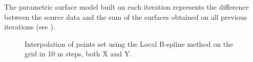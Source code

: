 The parametric surface model built on each iteration represents the difference between the source data and the sum of the surfaces obtained on all previous iterations (see ).

\begin{figure}[h]
	\caption{Interpolation of points set using the Local B-spline method on the grid in 10 m steps, both X and Y.}
	\label{ris:local_b_spline}
\end{figure}

\clearpage